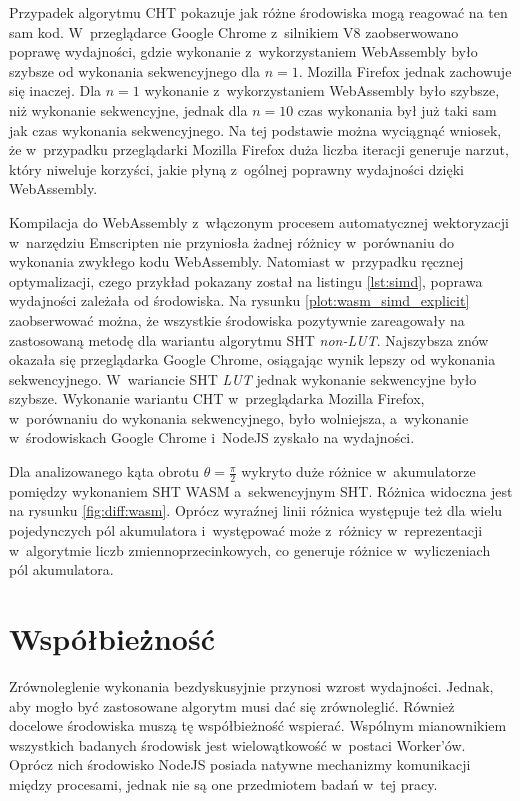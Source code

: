 Przypadek algorytmu CHT pokazuje jak różne środowiska mogą reagować na ten sam kod. W~przeglądarce Google Chrome z~silnikiem V8 zaobserwowano poprawę wydajności, gdzie wykonanie z~wykorzystaniem WebAssembly było  szybsze od wykonania sekwencyjnego dla $n = 1$. Mozilla Firefox jednak zachowuje się inaczej. Dla $n = 1$ wykonanie z~wykorzystaniem WebAssembly było  szybsze, niż wykonanie sekwencyjne, jednak dla $n = 10$ czas wykonania był już taki sam jak czas wykonania sekwencyjnego. Na tej podstawie można wyciągnąć wniosek, że w~przypadku przeglądarki Mozilla Firefox duża liczba iteracji generuje narzut, który niweluje korzyści, jakie płyną z~ogólnej poprawny wydajności dzięki WebAssembly. 

Kompilacja do WebAssembly z~włączonym procesem automatycznej wektoryzacji w~narzędziu Emscripten nie przyniosła żadnej różnicy w~porównaniu do wykonania zwykłego kodu WebAssembly. Natomiast w~przypadku ręcznej optymalizacji, czego przykład pokazany został na listingu \ref{lst:simd}, poprawa wydajności zależała od środowiska. Na rysunku \ref{plot:wasm_simd_explicit} zaobserwować można, że wszystkie środowiska pozytywnie zareagowały na zastosowaną metodę dla wariantu algorytmu SHT \textit{non-LUT}. Najszybsza znów okazała się przeglądarka Google Chrome, osiągając wynik  lepszy od wykonania sekwencyjnego. W~wariancie SHT \textit{LUT} jednak wykonanie sekwencyjne było  szybsze. Wykonanie wariantu CHT w~przeglądarka Mozilla Firefox, w~porównaniu do wykonania sekwencyjnego, było wolniejsza, a~wykonanie w~środowiskach Google Chrome i~NodeJS zyskało na wydajności.

Dla analizowanego kąta obrotu $\theta = \frac{\pi}{2}$ wykryto duże różnice w~akumulatorze pomiędzy wykonaniem SHT WASM a~sekwencyjnym SHT. Różnica widoczna jest na rysunku \ref{fig:diff:wasm}. Oprócz wyraźnej linii różnica występuje też dla wielu pojedynczych pól akumulatora i~występować może z~różnicy w~reprezentacji w~algorytmie liczb zmiennoprzecinkowych, co generuje różnice w~wyliczeniach pól akumulatora.

\section{Współbieżność}

Zrównoleglenie wykonania bezdyskusyjnie przynosi wzrost wydajności. Jednak, aby mogło być zastosowane algorytm musi dać się zrównoleglić. Również docelowe środowiska muszą tę współbieżność wspierać. Wspólnym mianownikiem wszystkich badanych środowisk jest wielowątkowość w~postaci Worker'ów. Oprócz nich środowisko NodeJS posiada natywne mechanizmy komunikacji między procesami, jednak nie są one przedmiotem badań w~tej pracy.

